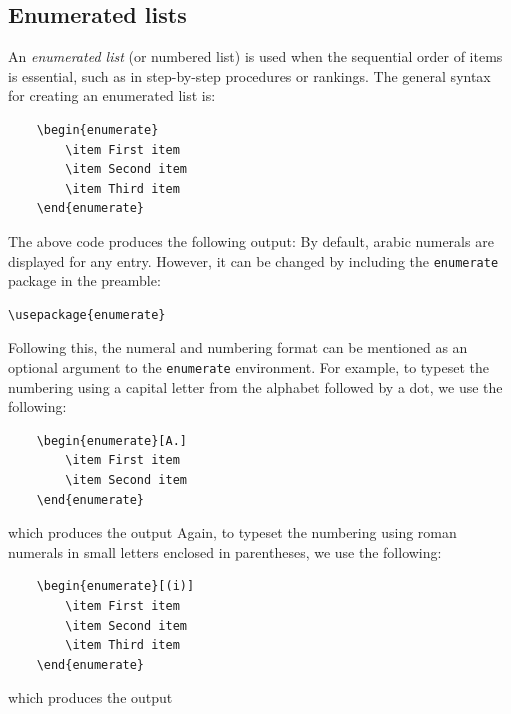 	\subsection{Enumerated lists}
		An \emph{enumerated list} (or numbered list) is used when the sequential order of items is essential, such as in step-by-step procedures or rankings. The general syntax for creating an enumerated list is:
\begin{lstlisting}
	\begin{enumerate}
		\item First item
		\item Second item
		\item Third item
	\end{enumerate}
\end{lstlisting}
		The above code produces the following output:
		By default, arabic numerals are displayed for any entry. However, it can be changed by including the \lstinline|enumerate| package in the preamble:
\begin{lstlisting}
\usepackage{enumerate}
\end{lstlisting}
		Following this, the numeral and numbering format can be mentioned as an optional argument to the \lstinline|enumerate| environment. For example, to typeset the numbering using a capital letter from the alphabet followed by a dot, we use the following:
\begin{lstlisting}
	\begin{enumerate}[A.]
		\item First item
		\item Second item
	\end{enumerate}
\end{lstlisting}
		which produces the output
		Again, to typeset the numbering using roman numerals in small letters enclosed in parentheses, we use the following:
\begin{lstlisting}
	\begin{enumerate}[(i)]
		\item First item
		\item Second item
		\item Third item
	\end{enumerate}
\end{lstlisting}
which produces the output

